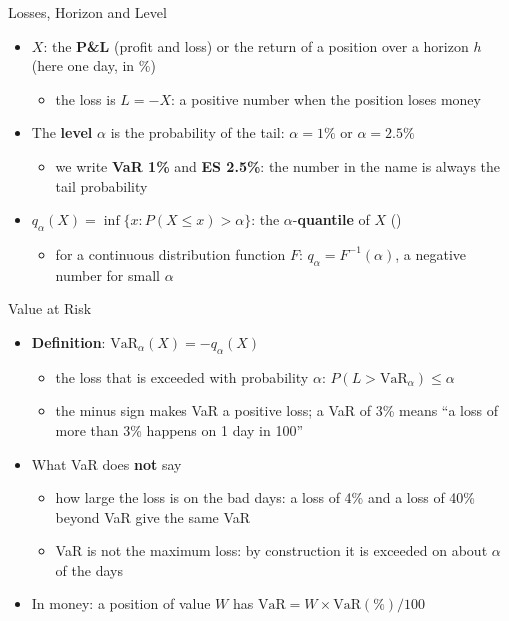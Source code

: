 \begin{frame}{Losses, Horizon and Level}
\itemsize{\small}
\begin{itemize}
    \item $X$: the \textbf{P\&L} (profit and loss) or the return of a position over a horizon $h$ (here one day, in \%)
    \begin{itemize}
        \item the loss is $L = -X$: a positive number when the position loses money
    \end{itemize}
    \item The \textbf{level} $\alpha$ is the probability of the tail: $\alpha = 1\%$ or $\alpha = 2.5\%$
    \begin{itemize}
        \item we write \textbf{VaR 1\%} and \textbf{ES 2.5\%}: the number in the name is always the tail probability
    \end{itemize}
    \item $q_\alpha(X) = \inf\{x : P(X \le x) > \alpha\}$: the $\alpha$-\textbf{quantile} of $X$ ()
    \begin{itemize}
        \item for a continuous distribution function $F$: $q_\alpha = F^{-1}(\alpha)$, a negative number for small $\alpha$
    \end{itemize}
\end{itemize}
\end{frame}

\begin{frame}{Value at Risk}
\itemsize{\small}
\begin{itemize}
    \item \textbf{Definition}: $\mathrm{VaR}_\alpha(X) = -q_\alpha(X)$
    \begin{itemize}
        \item the loss that is exceeded with probability $\alpha$: $P(L > \mathrm{VaR}_\alpha) \le \alpha$
        \item the minus sign makes VaR a positive loss; a VaR of 3\% means ``a loss of more than 3\% happens on 1 day in 100''
    \end{itemize}
    \item What VaR does \textbf{not} say
    \begin{itemize}
        \item how large the loss is on the bad days: a loss of 4\% and a loss of 40\% beyond VaR give the same VaR
        \item VaR is not the maximum loss: by construction it is exceeded on about $\alpha$ of the days
    \end{itemize}
    \item In money: a position of value $W$ has $\mathrm{VaR} = W \times \mathrm{VaR}(\%)/100$
\end{itemize}
\end{frame}

